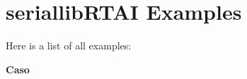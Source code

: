 \section{seriallib\-RTAI Examples}
Here is a list of all examples:\begin{CompactItemize}
\item 
\bf{Caso}
\end{CompactItemize}
